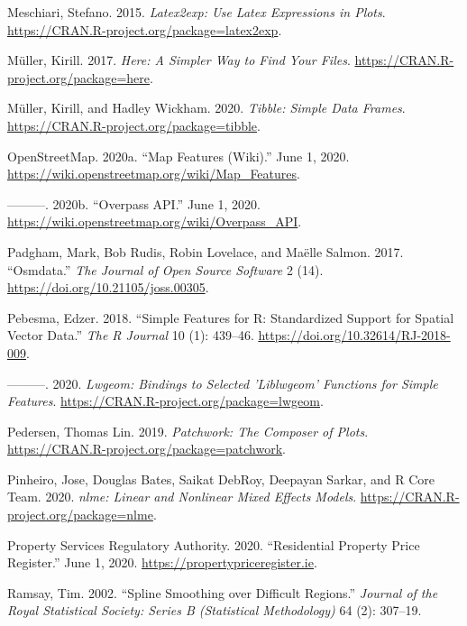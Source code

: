 \documentclass[conference,final,]{IEEEtran}
\newlength{\cslhangindent}
\newenvironment{cslreferences}%
  {\setlength{\parindent}{0pt}%
  \everypar{\setlength{\hangindent}{\cslhangindent}}\ignorespaces}%
  {\par}
\begin{document}
\begin{cslreferences}
\leavevmode\hypertarget{ref-R-latex2exp}{}%
Meschiari, Stefano. 2015. \emph{Latex2exp: Use Latex Expressions in Plots}. \url{https://CRAN.R-project.org/package=latex2exp}.

\leavevmode\hypertarget{ref-R-here}{}%
Müller, Kirill. 2017. \emph{Here: A Simpler Way to Find Your Files}. \url{https://CRAN.R-project.org/package=here}.

\leavevmode\hypertarget{ref-R-tibble}{}%
Müller, Kirill, and Hadley Wickham. 2020. \emph{Tibble: Simple Data Frames}. \url{https://CRAN.R-project.org/package=tibble}.

\leavevmode\hypertarget{ref-openstreetmap2020}{}%
OpenStreetMap. 2020a. ``Map Features (Wiki).'' June 1, 2020. \url{https://wiki.openstreetmap.org/wiki/Map_Features}.

\leavevmode\hypertarget{ref-wiki2010overpass}{}%
---------. 2020b. ``Overpass API.'' June 1, 2020. \url{https://wiki.openstreetmap.org/wiki/Overpass_API}.

\leavevmode\hypertarget{ref-R-osmdata}{}%
Padgham, Mark, Bob Rudis, Robin Lovelace, and Maëlle Salmon. 2017. ``Osmdata.'' \emph{The Journal of Open Source Software} 2 (14). \url{https://doi.org/10.21105/joss.00305}.

\leavevmode\hypertarget{ref-R-sf}{}%
Pebesma, Edzer. 2018. ``Simple Features for R: Standardized Support for Spatial Vector Data.'' \emph{The R Journal} 10 (1): 439--46. \url{https://doi.org/10.32614/RJ-2018-009}.

\leavevmode\hypertarget{ref-R-lwgeom}{}%
---------. 2020. \emph{Lwgeom: Bindings to Selected 'Liblwgeom' Functions for Simple Features}. \url{https://CRAN.R-project.org/package=lwgeom}.

\leavevmode\hypertarget{ref-R-patchwork}{}%
Pedersen, Thomas Lin. 2019. \emph{Patchwork: The Composer of Plots}. \url{https://CRAN.R-project.org/package=patchwork}.

\leavevmode\hypertarget{ref-R-nlme}{}%
Pinheiro, Jose, Douglas Bates, Saikat DebRoy, Deepayan Sarkar, and R Core Team. 2020. \emph{nlme: Linear and Nonlinear Mixed Effects Models}. \url{https://CRAN.R-project.org/package=nlme}.

\leavevmode\hypertarget{ref-rppr2020}{}%
Property Services Regulatory Authority. 2020. ``Residential Property Price Register.'' June 1, 2020. \url{https://propertypriceregister.ie}.

\leavevmode\hypertarget{ref-ramsay2002spline}{}%
Ramsay, Tim. 2002. ``Spline Smoothing over Difficult Regions.'' \emph{Journal of the Royal Statistical Society: Series B (Statistical Methodology)} 64 (2): 307--19.


\end{cslreferences}
\end{document}
